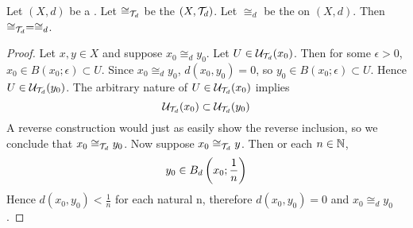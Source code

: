
\begin{prop}
    \label{prop:relationofzerodistance}
    Let $(X,d)$ be a \PseudometricSpace.
    Let $\cong_{\mathcal{T}_d}$ be the \RelationOfEqualNeighborhoodFilters $(X,\mathcal{T}_d)$. 
    Let $\cong_d$ be the \RelationOfZeroDistance on $(X,d)$. 
    Then $\cong_{\mathcal{T}_d} = \cong_d$. 
    \begin{proof}
        Let $x,y \in X$ and suppose $x_0 \cong_d y_0$.
        Let $U \in \mathcal{U}_{\mathcal{T}_d}(x_0)$. Then for some $\epsilon > 0$, 
        $x_0 \in B(x_0;\epsilon) \subset U$. 
        Since $x_0 \cong_d y_0$, $d(x_0,y_0) = 0$, so $y_0 \in B(x_0 ; \epsilon) \subset U$. 
        Hence $U \in \mathcal{U}_{\mathcal{T}_d}(y_0)$. 
        The arbitrary nature of $U \in \mathcal{U}_{\mathcal{T}_d}(x_0)$ implies 
        \begin{equation}
            \mathcal{U}_{\mathcal{T}_d}(x_0) \subset \mathcal{U}_{\mathcal{T}_d}(y_0)
        \end{equation}
        A reverse construction would just as easily show the reverse inclusion, so we conclude that $x_0 \cong_{\mathcal{T}_d} y_0$. 
        Now suppose $x_0 \cong_{\mathcal{T}_d} y $. Then or each $n \in \mathbb{N}$, 
        \begin{equation}
            y_0 \in B_{d} \left( x_0 ; \frac{1}{n}\right)
        \end{equation}
        Hence $d(x_0, y_0) < \frac{1}{n}$ for each natural n, therefore $d(x_0,y_0) = 0$ and $x_0 \cong_d y_0$. 
    \end{proof}
\end{prop}
